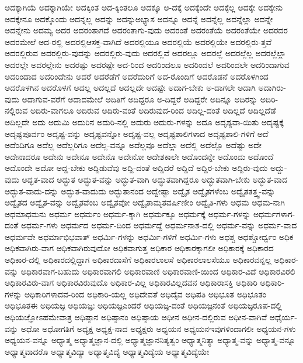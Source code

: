 {ಅದಕ್ಕಾಗಿಯೆ
ಅದಕ್ಕಾಗಿಯೇ
ಅದಕ್ಕಿಂತ
ಅದ-ಕ್ಕಿಂತಲೂ
ಅದಕ್ಕೂ
ಅ-ದಕ್ಕೆ
ಅದಕ್ಕೆಂದೇ
ಅದಕ್ಕೆಲ್ಲ
ಅದಕ್ಕೇ
ಅದಕ್ಕೇನು
ಅದಕ್ಕೇನೂ
ಅದಕ್ಕೊಂದು
ಅದನ್ನಲ್ಲ
ಅದನ್ನು
ಅದನ್ನುಅಭ್ಯಾಸ
ಅದನ್ನೂ
ಅದನ್ನೆ
ಅದನ್ನೆಲ್ಲ
ಅದನ್ನೆಲ್ಲಾ
ಅದನ್ನೇ
ಅದನ್ನೇನು
ಅದಮ್ಯ
ಅದರ
ಅದರಂತಾಗದೆ
ಅದರಂತಾಗು-ವುದು
ಅದರಂತೆ
ಅದರಂತೆಯೆ
ಅದರಂತೆಯೇ
ಅದರದರ
ಅದರಮೇಲೆ
ಅದ-ರಲ್ಲಿ
ಅದರಲ್ಲಿಆಸಕ್ತ-ವಾಗಿದೆ
ಅದರಲ್ಲಿಯೂ
ಅದರಲ್ಲಿಯೆ
ಅದರಲ್ಲಿಯೇ
ಅದರಲ್ಲಿರು-ತ್ತವೆ
ಅದರಲ್ಲಿರುವ
ಅದರಲ್ಲಿರು-ವುದನ್ನು
ಅದರಲ್ಲಿರು-ವುದು
ಅದರಲ್ಲಿವೆ
ಅದರಲ್ಲೂ
ಅದರಲ್ಲೆ
ಅದರಲ್ಲೆಲ್ಲ
ಅದರಲ್ಲೆಲ್ಲಾ
ಅದರಲ್ಲೇ
ಅದರಲ್ಲೇನು
ಅದರಷ್ಟು
ಅದರಷ್ಟೇ
ಅದ-ರಿಂದ
ಅದರಿಂದಲೂ
ಅದರಿಂದಲೆ
ಅದರಿಂದಲೇ
ಅದರಿಂದಾಗುವ
ಅದರಿಂದಾದ
ಅದರಿಂದೇನು
ಅದರೆ
ಅದರೆಡೆಗೆ
ಅದರೆದುರಿಗೆ
ಅದ-ರೊಂದಿಗೆ
ಅದರೊಡನೆ
ಅದರೊಳಗಿಂದ
ಅದರೊಳಗಿನ
ಅದರೊಳಗೆ
ಅದಲ್ಲ
ಅದಲ್ಲದೆ
ಅದಲ್ಲದೇ
ಅದಷ್ಟೇ
ಅದಾಗ-ಬೇಕು
ಅ-ದಾಗಲೇ
ಅದಾಗಿ
ಅದಾಗಿರು-ವುದು
ಅದಾಗುವ-ವರೆಗೆ
ಅದಾದಮೇಲೆ
ಅದಿತಿಗೆ
ಅದಿದ್ದರೂ
ಅ-ದಿದ್ದರೆ
ಅದಿದ್ದರೇ
ಅದಿನ್ನೂ
ಅದಿರನ್ನು
ಅದಿರಿ-ನಲ್ಲಿರುವ
ಅದಿರು-ವಾಗಲೂ
ಅದಿರುವ
ಅದಿರು-ವಂತೆ
ಅದಿರುವುದ-ರಿಂದ
ಅದಿಲ್ಲ-ದಂತೆ
ಅದಿಲ್ಲದೆ
ಅದಿಲ್ಲದೆಡೆ
ಅದಿಲ್ಲದೇ
ಅದು
ಅದುಮಿ
ಅದುರಿನ
ಅದುರಿ-ನಲ್ಲಿ
ಅದುರು
ಅದುರು-ಗಳನ್ನು
ಅದೂ
ಅದೃಶ್ಯವಾ-ಯಿತು
ಅದೃಷ್ಟಕ್ಕೆ
ಅದೃಷ್ಟಪೂರ್ವಂ
ಅದೃಷ್ಟ-ವನ್ನು
ಅದೃಷ್ಟವನ್ನೋ
ಅದೃಷ್ಟ-ವಲ್ಲ
ಅದೃಷ್ಟಶಾಲಿಗಳಾದ
ಅದೃಷ್ಟಶಾಲಿ-ಗಳಿಗೆ
ಅದೆ
ಅದೆಂದಿಗೂ
ಅದೆಲ್ಲ
ಅದೆಲ್ಲರಿಗೂ
ಅದೆಲ್ಲ-ವನ್ನೂ
ಅದೆಲ್ಲವೂ
ಅದೆಲ್ಲಾ
ಅದೆಲ್ಲಿ
ಅದೆಲ್ಲೊ
ಅದೆಷ್ಟು
ಅದೇ
ಅದೇನಾದರೂ
ಅದೇನು
ಅದೇನೂ
ಅದೇನೊ
ಅದೇನೋ
ಅದೇಶಕಾಲೇ
ಅದೊಂದನ್ನೇ
ಅದೊಂದು
ಅದೊಂದೆ
ಅದೊಂದೇ
ಅದೋ
ಅದ್ದ-ಬೇಕು
ಅದ್ದಿಡುವೆವು
ಅದ್ದಿ-ದಂತೆ
ಅದ್ದಿದರೆ
ಅದ್ದಿದೆ
ಅದ್ದಿರ-ಬೇಕು
ಅದ್ದಿರು-ವುದು
ಅದ್ದು-ವುದು
ಅದ್ಭತ-ವಾದ
ಅದ್ಭುತ
ಅದ್ಭುತ-ವನ್ನು
ಅದ್ಭುತ-ವಾಗಿ
ಅದ್ಭುತವಾಗಿದ್ದರೂ
ಅದ್ಭುತವಾಗಿ-ಬೇಕು
ಅದ್ಭುತ-ವಾದ
ಅದ್ಭುತ-ವಾದು-ದನ್ನು
ಅದ್ಭುತ-ವಾದುದು
ಅದ್ಭುತಾನಂದ
ಅದ್ವೇಷ್ಟಾ
ಅದ್ವೈತ
ಅದ್ವೈತಗಳೆಂಬ
ಅದ್ವೈತತತ್ತ್ವ-ವನ್ನು
ಅದ್ವೈತದ
ಅದ್ವೈತ-ವನ್ನು
ಅದ್ವೈತವೆಂಬ
ಅದ್ವೈತವೋ
ಅದ್ವೈತಾಮೃತವರ್ಷಿಣೀಂ
ಅದ್ವೈತಿ-ಗಳು
ಅಧಮ
ಅಧಮ-ನಾಗಿ
ಅಧಮಾಧಮನು
ಅಧರ್ಮ
ಅಧರ್ಮಂ
ಅಧರ್ಮ-ಕ್ಕಾಗಿ
ಅಧರ್ಮಕ್ಕೂ
ಅಧರ್ಮಕ್ಕೆ
ಅಧರ್ಮ-ಗಳನ್ನು
ಅಧರ್ಮಗಳಾಗ-ದಂತೆ
ಅಧರ್ಮ-ಗಳು
ಅಧರ್ಮದ
ಅಧರ್ಮ-ದಿಂದ
ಅಧರ್ಮದ್ದೆ
ಅಧರ್ಮನಾಶ-ದಲ್ಲಿ
ಅಧರ್ಮ-ವನ್ನು
ಅಧರ್ಮ-ವಾದ
ಅಧರ್ಮವೇ
ಅಧರ್ಮಾಭಿಭವಾತ್
ಅಧರ್ಮಿ-ಗಳನ್ನು
ಅಧರ್ಮಿ-ಗಳಿಗೆ
ಅಧರ್ಮಿ-ಗಳು
ಅಧಶ್ಚ
ಅಧಶ್ಚೋರ್ಧ್ವಂ
ಅಧಿಕ
ಅಧಿಕವಾಗಿರು-ವಾಗ
ಅಧಿಕವಾಗಿರುವುದೋ
ಅಧಿಕವಾಗುತ್ತ
ಅಧಿಕಾರ
ಅಧಿಕಾರಕ್ಕಾಗಲೀ
ಅಧಿಕಾರಕ್ಕೆ
ಅಧಿಕಾರದ
ಅಧಿಕಾರ-ದಲ್ಲಿ
ಅಧಿಕಾರದಲ್ಲಿದ್ದಾಗ
ಅಧಿಕಾರದಾಸೆಗೆ
ಅಧಿಕಾರಲಾಲಸೆ
ಅಧಿಕಾರಲಾಲಸೆಯೂ
ಅಧಿಕಾರವನ್ನಲ್ಲ
ಅಧಿಕಾರ-ವನ್ನು
ಅಧಿಕಾರವಾಗ-ಬಹುದು
ಅಧಿಕಾರವಾಗಲಿ
ಅಧಿಕಾರವಾಣಿ
ಅಧಿಕಾರವಾಣಿ-ಯಿಂದ
ಅಧಿಕಾರ-ವಿದೆ
ಅಧಿಕಾರವಿರಲಿ
ಅಧಿಕಾರವಿರು-ವಾಗ
ಅಧಿಕಾರವಿರುವುದೊ
ಅಧಿಕಾರ-ವಿಲ್ಲ
ಅಧಿಕಾರವಿಲ್ಲದವನ
ಅಧಿಕಾರಾಸಕ್ತಿ
ಅಧಿಕಾರಿ
ಅಧಿಕಾರಿ-ಗಳನ್ನು
ಅಧಿಕಾರಿಗಳಾದವ-ರಿಂದ
ಅಧಿಕಾರಿ-ಯಲ್ಲ
ಅಧಿದೇವತೆ
ಅಧಿದೈವ
ಅಧಿಪತಿ
ಅಧಿಭೂತ
ಅಧಿಭೂತಂ
ಅಧಿಭೂತಈ
ಅಧಿಯಜ್ಞ
ಅಧಿಯಜ್ಞಃ
ಅಧಿಯಜ್ಞಎಂದರೆ
ಅಧಿಯಜ್ಞ-ದಂತೆ
ಅಧಿಯಜ್ಞನಂತೆ
ಅಧಿಯಜ್ಞರೂಪ-ದಲ್ಲಿ
ಅಧಿಯಜ್ಞೋಽಹಮೇವಾತ್ರ
ಅಧಿಷ್ಠಾನ
ಅಧಿಷ್ಠಾನಂ
ಅಧಿಷ್ಠಾಯ
ಅಧೀನ
ಅಧೀನ-ದಲ್ಲಿರುವ
ಅಧೀನ-ವಾಗಿವೆ
ಅಧೈರ್ಯ-ವನ್ನು
ಅಧೋ
ಅಧೋಗತಿಗೆ
ಅಧ್ಯಕ್ಷ
ಅಧ್ಯಕ್ಷ-ನಾದ
ಅಧ್ಯಕ್ಷರು
ಅಧ್ಯಯನ
ಅಧ್ಯಯನಇವುಗಳಿಂದಾಗಲೀ
ಅಧ್ಯಯನ-ಗಳು
ಅಧ್ಯಯನ-ವನ್ನೂ
ಅಧ್ಯಾತ್ಮ
ಅಧ್ಯಾತ್ಮಜ್ಞಾನ-ದಲ್ಲಿ
ಅಧ್ಯಾತ್ಮಜ್ಞಾನನಿತ್ಯತ್ವಂ
ಅಧ್ಯಾತ್ಮನಿತ್ಯಾ
ಅಧ್ಯಾತ್ಮ-ವನ್ನು
ಅಧ್ಯಾತ್ಮ-ವನ್ನೂ
ಅಧ್ಯಾತ್ಮವಾದರೊ
ಅಧ್ಯಾತ್ಮವಿದ್ಯಾ
ಅಧ್ಯಾತ್ಮವಿದ್ಯೆ
ಅಧ್ಯಾತ್ಮವಿದ್ಯೆಯ
ಅಧ್ಯಾತ್ಮವಿದ್ಯೆಯೇ
}
